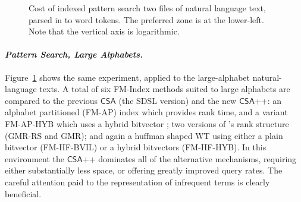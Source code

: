 \documentclass{llncs}
\newcommand{\myparagraph}[1]{\paragraph*{\normalsize\it#1.}}
\newcommand{\CSA}[0]{\ensuremath{\mathsf{CSA}}}
\begin{document}
\begin{figure}[t]
 \vspace*{-2mm}
\caption{Cost of indexed pattern search two  files of natural
language text, parsed in to word tokens.
The preferred zone is at the lower-left.
Note that the vertical axis is logarithmic.
\label{fig-count-int}}
\end{figure}

\myparagraph{Pattern Search, Large Alphabets}

Figure~\ref{fig-count-int} shows the same experiment, applied to the
large-alphabet natural-language texts.
A total of six FM-Index methods suited to large alphabets are
compared to the previous {\CSA} (the SDSL version) and the new
{\CSA++}: an alphabet partitioned (FM-AP) index {\citep{bgnn10isaac}}
which provides  rank time, and a variant FM-AP-HYB
which uses a hybrid bitvector {\cite{kkp14dcc}}; two versions of
{\citeauthor{gmr06soda}}'s {\cite{gmr06soda}} rank structure (GMR-RS
and GMR); and again a huffman shaped WT using either a plain bitvector
(FM-HF-BVIL) or a hybrid bitvectors (FM-HF-HYB).
In this environment the {\CSA++} dominates all of the alternative
mechanisms, requiring either substantially less space, or offering
greatly improved query rates.
The careful attention paid to the representation of infrequent terms
is clearly beneficial.
\end{document}
